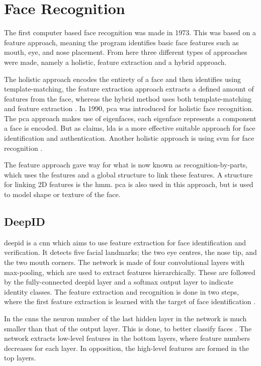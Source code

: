 \section{Face Recognition}
The first computer based face recognition was made in 1973. This was based on a feature approach, meaning the program identifies basic face features such as mouth, eye, and nose placement. 
From here three different types of approaches were made, namely a holistic, feature extraction and a hybrid approach. 

The holistic approach encodes the entirety of a face and then identifies using template-matching, the feature extraction approach extracts a defined amount of features from the face, whereas the hybrid method uses both template-matching and feature extraction \citep{Wechsler2007}.
In 1990, \gls{pca} was introduced for holistic face recognition. The \gls{pca} approach makes use of eigenfaces, each eigenface represents a component a face is encoded. But as \cite{Wechsler2007} claims, \gls{lda} is a more effective suitable approach for face identification and authentication. Another holistic approach is using \gls{svm} for face recognition \citep{Wechsler2007}.

The feature approach gave way for what is now known as recognition-by-parts, which uses the features and a global structure to link these features. A structure for linking 2D features is the \gls{hmm}. \gls{pca} is also used in this approach, but is used to model shape or texture of the face.

\subsection{DeepID}
\gls{deepid} is a \gls{cnn} which aims to use feature extraction for face identification and verification. It detects five facial landmarks; the two eye centres, the nose tip, and the two mouth corners. The network is made of four convolutional layers with max-pooling, which are used to extract features hierarchically. These are followed by the fully-connected \gls{deepid} layer and a softmax output layer to indicate identity classes. The feature extraction and recognition is done in two steps, where the first feature extraction is learned with the target of face identification \citep{deepID2014}.

In the \gls{cnn}s the neuron number of the last hidden layer in the network is much smaller than that of the output layer. This is done, to better classify faces \citep{deepID2014}. The network extracts low-level features in the bottom layers, where feature numbers decreases for each layer. In opposition, the high-level features are formed in the top layers.

